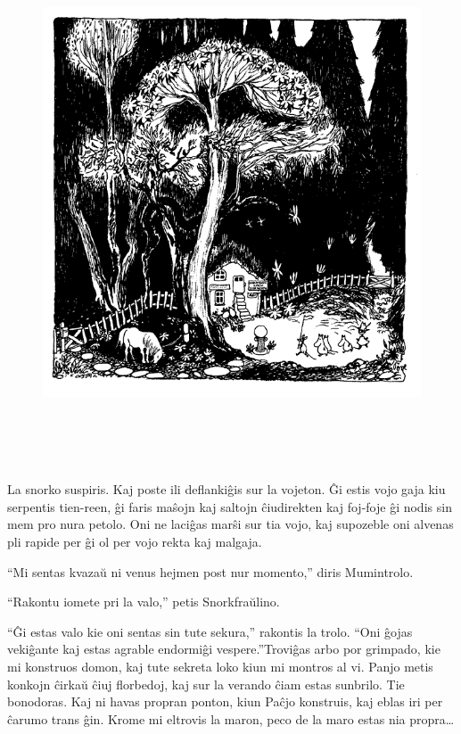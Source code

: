 \begin{figure}[htbp]
\centering
\includegraphics[width=425pt,height=440pt]{6-2.png}
\caption{}
\label{6-2}
\end{figure}

La snorko suspiris. Kaj poste ili deflankiĝis sur la vojeton. Ĝi estis vojo gaja kiu serpentis tien-reen, ĝi faris maŝojn kaj saltojn ĉiudirekten kaj foj-foje ĝi nodis sin mem pro nura petolo. Oni ne laciĝas marŝi sur tia vojo, kaj supozeble oni alvenas pli rapide per ĝi ol per vojo rekta kaj malgaja.

``Mi sentas kvazaŭ ni venus hejmen post nur momento,'' diris Mumintrolo.

``Rakontu iomete pri la valo,'' petis Snorkfraŭlino.

``Ĝi estas valo kie oni sentas sin tute sekura,'' rakontis la trolo. ``Oni ĝojas vekiĝante kaj estas agrable endormiĝi vespere.''Troviĝas arbo por grimpado, kie mi konstruos domon, kaj tute sekreta loko kiun mi montros al vi. Panjo metis konkojn ĉirkaŭ ĉiuj florbedoj, kaj sur la verando ĉiam estas sunbrilo. Tie bonodoras. Kaj ni havas propran ponton, kiun Paĉjo konstruis, kaj eblas iri per ĉarumo trans ĝin. Krome mi eltrovis la maron, peco de la maro estas nia propra{\ldots}

